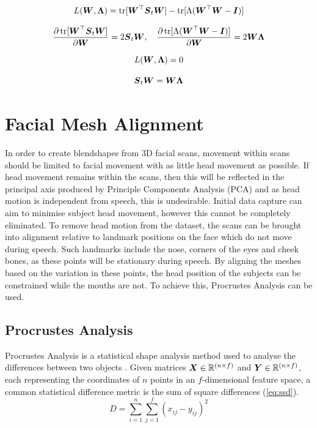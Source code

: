 \begin{equation*}
    L({\boldsymbol{{W}}}, {\boldsymbol{{\Lambda}}}) = \operatorname{tr}[{\boldsymbol{{W}}}^\top {\boldsymbol{{S}}}_t {\boldsymbol{{W}}}] - \operatorname{tr}[\Lambda({\boldsymbol{{W}}}^\top {\boldsymbol{{W}}} - {\boldsymbol{{I}}})]
\end{equation*}

\begin{equation*}
    \frac{\partial \operatorname{tr}[{\boldsymbol{{W}}}^\top {\boldsymbol{{S}}}_t {\boldsymbol{{W}}}]}{\partial {\boldsymbol{{W}}}} = 2 {\boldsymbol{{S}}}_t {\boldsymbol{{W}}},
    \quad
    \frac{\partial \operatorname{tr}[\Lambda({\boldsymbol{{W}}}^\top {\boldsymbol{{W}}} - {\boldsymbol{{I}}})]}{\partial {\boldsymbol{{W}}}} = 2 {\boldsymbol{{W \Lambda}}}
\end{equation*}

\begin{equation*}
    L({\boldsymbol{{W}}}, {\boldsymbol{{\Lambda}}}) = 0 
\end{equation*}

\begin{equation} \label{eq:pca_solved}
    {\boldsymbol{{S}}}_t {\boldsymbol{{W}}} = {\boldsymbol{{W \Lambda}}}
\end{equation}

\section{Facial Mesh Alignment}
In order to create blendshapes from 3D facial scans, movement within scans should be limited to facial movement with as little head movement as possible.
If head movement remains within the scans, then this will be reflected in the principal axis produced by Principle Components Analysis (PCA) and as head motion is independent from speech, this is undesirable.
Initial data capture can aim to minimise subject head movement, however this cannot be completely eliminated.
To remove head motion from the dataset, the scans can be brought into alignment relative to landmark positions on the face which do not move during speech.
Such landmarks include the nose, corners of the eyes and cheek bones, as these points will be stationary during speech.
By aligning the meshes based on the variation in these points, the head position of the subjects can be constrained while the mouths are not.
To achieve this, Procrustes Analysis can be used.

\subsection{Procrustes Analysis} \label{sec:procrustes_analysis}
Procrustes Analysis is a statistical shape analysis method used to analyse the differences between two objects \cite{Krzanowski2000}.
Given matrices ${\boldsymbol{{X}}} \in \mathbb{R}^{(n\times f)}$ and ${\boldsymbol{{Y}}} \in \mathbb{R}^{(n\times f)}$, each representing the coordinates of $n$ points in an $f$-dimensional feature space, a common statistical difference metric is the sum of square differences (\ref{eq:ssd}).
\begin{equation}
    \label{eq:ssd}
    D = \sum_{i=1}^{n} \sum_{j=1}^{f} (x_{ij} - y_{ij})^2
\end{equation}

